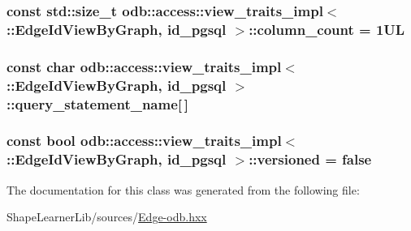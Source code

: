 \subsubsection[{column\+\_\+count}]{\setlength{\rightskip}{0pt plus 5cm}const std\+::size\+\_\+t odb\+::access\+::view\+\_\+traits\+\_\+impl$<$ \+::{\bf Edge\+Id\+View\+By\+Graph}, id\+\_\+pgsql $>$\+::column\+\_\+count = 1\+U\+L\hspace{0.3cm}{\ttfamily [static]}}\label{classodb_1_1access_1_1view__traits__impl_3_01_1_1_edge_id_view_by_graph_00_01id__pgsql_01_4_ad28fa5ddc43b39e73f58aa4358e9ca18}
\hypertarget{classodb_1_1access_1_1view__traits__impl_3_01_1_1_edge_id_view_by_graph_00_01id__pgsql_01_4_a32436fb44381c6c1ff817549849fa1ca}{}
\subsubsection[{query\+\_\+statement\+\_\+name}]{\setlength{\rightskip}{0pt plus 5cm}const char odb\+::access\+::view\+\_\+traits\+\_\+impl$<$ \+::{\bf Edge\+Id\+View\+By\+Graph}, id\+\_\+pgsql $>$\+::query\+\_\+statement\+\_\+name\mbox{[}$\,$\mbox{]}\hspace{0.3cm}{\ttfamily [static]}}\label{classodb_1_1access_1_1view__traits__impl_3_01_1_1_edge_id_view_by_graph_00_01id__pgsql_01_4_a32436fb44381c6c1ff817549849fa1ca}
\hypertarget{classodb_1_1access_1_1view__traits__impl_3_01_1_1_edge_id_view_by_graph_00_01id__pgsql_01_4_a04fe6440050eb1e2f892a942416cb436}{}
\subsubsection[{versioned}]{\setlength{\rightskip}{0pt plus 5cm}const bool odb\+::access\+::view\+\_\+traits\+\_\+impl$<$ \+::{\bf Edge\+Id\+View\+By\+Graph}, id\+\_\+pgsql $>$\+::versioned = false\hspace{0.3cm}{\ttfamily [static]}}\label{classodb_1_1access_1_1view__traits__impl_3_01_1_1_edge_id_view_by_graph_00_01id__pgsql_01_4_a04fe6440050eb1e2f892a942416cb436}


The documentation for this class was generated from the following file\+:\begin{DoxyCompactItemize}
\item 
Shape\+Learner\+Lib/sources/\hyperlink{_edge-odb_8hxx}{Edge-\/odb.\+hxx}\end{DoxyCompactItemize}
